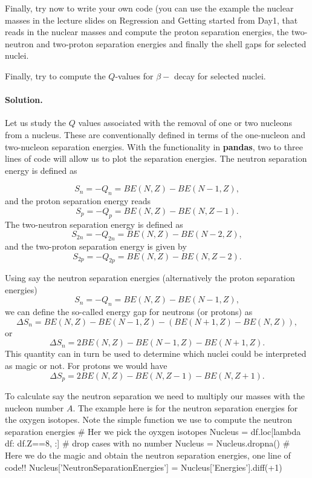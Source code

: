 \documentclass[%
oneside,                 %
final,                   %
10pt]{article}
\newenvironment{doconceexercise}{}{}
\newcounter{doconceexercisecounter}
\begin{document}
\begin{doconceexercise}

                             

Finally, try now to write your own code (you can use the example the nuclear masses in the lecture slides on Regression and Getting started from Day1, that reads in the nuclear masses and
compute the proton separation energies, the two-neutron and two-proton separation energies and finally the shell gaps for selected nuclei.

Finally, try to compute the $Q$-values for $\beta-$ decay for selected nuclei.


\paragraph{Solution.}
Let us study the $Q$ values associated with the removal of one or two nucleons from
a nucleus. These are conventionally defined in terms of the one-nucleon and two-nucleon
separation energies. With the functionality in \textbf{pandas}, two to three lines of code will allow us to plot the separation energies.
The neutron separation energy is defined as 

\[
S_n= -Q_n= BE(N,Z)-BE(N-1,Z),
\]
and the proton separation energy reads
\[
S_p= -Q_p= BE(N,Z)-BE(N,Z-1).
\]
The two-neutron separation energy is defined as
\[
S_{2n}= -Q_{2n}= BE(N,Z)-BE(N-2,Z),
\]
and  the two-proton separation energy is given by
\[
S_{2p}= -Q_{2p}= BE(N,Z)-BE(N,Z-2).
\]

Using say the neutron separation energies (alternatively the proton separation energies)
\[
S_n= -Q_n= BE(N,Z)-BE(N-1,Z),
\]
we can define the so-called energy gap for neutrons (or protons) as 
\[
\Delta S_n= BE(N,Z)-BE(N-1,Z)-\left(BE(N+1,Z)-BE(N,Z)\right),
\]
or 
\[
\Delta S_n= 2BE(N,Z)-BE(N-1,Z)-BE(N+1,Z).
\]
This quantity can in turn be used to determine which nuclei could be interpreted as  magic or not. 
For protons we would have 
\[
\Delta S_p= 2BE(N,Z)-BE(N,Z-1)-BE(N,Z+1).
\]

To calculate say the neutron separation we need to multiply our masses with the nucleon number $A$.
The example here is for the neutron separation energies for the oxygen isotopes.
Note the simple function we use to compute the neutron separation energies
\bpycod
# Her we pick the oyxgen isotopes
Nucleus = df.loc[lambda df: df.Z==8, :]
# drop cases with no number
Nucleus = Nucleus.dropna()
# Here we do the magic and obtain the neutron separation energies, one line of code!!
Nucleus['NeutronSeparationEnergies'] = Nucleus['Energies'].diff(+1)
\epycod


\end{doconceexercise}
\end{document}
